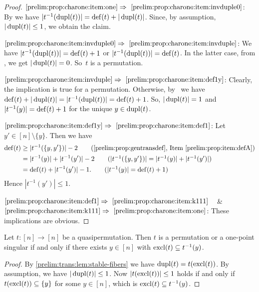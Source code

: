 \begin{proof}
	$\ref{prelim:prop:charone:item:one} \Rightarrow~\ref{prelim:prop:charone:item:invduple0}$:
	By  we have
	$|t^{-1}(\operatorname{dupl}(t))| = \operatorname{def}(t) + |\operatorname{dupl}(t)|$.
	Since, by assumption, $|\operatorname{dupl}(t)|\le 1$, we obtain the claim.	
	
	$\ref{prelim:prop:charone:item:invduple0} \Rightarrow~\ref{prelim:prop:charone:item:invduple}$: 
	We have $|t^{-1}(\operatorname{dupl}(t))| = \operatorname{def}(t) + 1$
	or $|t^{-1}(\operatorname{dupl}(t))| = \operatorname{def}(t)$.
	In the latter case, from ,
	we get $|\operatorname{dupl}(t)| = 0$. So~$t$ is a permutation.
	 
	$\ref{prelim:prop:charone:item:invduple}\Rightarrow~\ref{prelim:prop:charone:item:def1y}$: Clearly, the implication is true for a permutation. 
	Otherwise, by~
	we have $\operatorname{def}(t) + |\operatorname{dupl}(t)| = |t^{-1}(\operatorname{dupl}(t))| = \operatorname{def}(t) + 1$.
	So, $|\operatorname{dupl}(t)| = 1$ and 
	$|t^{-1}(y)| = \operatorname{def}(t) + 1$
	for the unique $y \in \operatorname{dupl}(t)$.
	
	$\ref{prelim:prop:charone:item:def1y} \Rightarrow~\ref{prelim:prop:charone:item:def1}$: Let $y' \in [n] \setminus \{y\}$.
	Then we have
	\begin{align*}
	\defect{t} & \ge |t^{-1}(\{y,y'\})| - 2 \tag{\crefitem{prelim:prop:gentransdef}{prelim:prop:item:defA}} \\
	& = |t^{-1}(y)| + |t^{-1}(y')| - 2 \tag{$|t^{-1}(\{y,y'\})| = |t^{-1}(y)| + |t^{-1}(y')|$} \\
	& = \defect{t} + |t^{-1}(y')| - 1. \tag{$|t^{-1}(y)| = \defect{t} + 1$}
	\end{align*}
	Hence $|t^{-1}(y')| \le 1$.	
	
	$\ref{prelim:prop:charone:item:def1} \Rightarrow~\ref{prelim:prop:charone:item:k111}$ ~ \& ~
	$\ref{prelim:prop:charone:item:k111} \Rightarrow~\ref{prelim:prop:charone:item:one}$: These implications are obvious.
\end{proof}

\begin{proposition} \label{prelim:trans:cor:char-one-point-singular}
	Let $t \colon [n] \to [n]$ be a quasipermutation.
	Then $t$ is a permutation or a one-point singular
	if and only if there exists $y \in [n]$ with $\operatorname{excl}(t) \subseteq t^{-1}(y)$.	
\end{proposition}
\begin{proof}
	By \cref{prelim:trans:lem:stable-fibers} we have $\operatorname{dupl}(t) = t(\operatorname{excl}(t))$.
	By assumption, we have $|\operatorname{dupl}(t)| \le 1$.
	Now $|t(\operatorname{excl}(t))| \le 1$ holds if and only if
	$t(\operatorname{excl}(t)) \subseteq \{y\}$ for some $y \in [n]$, which is
	$\operatorname{excl}(t) \subseteq t^{-1}(y)$.
\end{proof}

